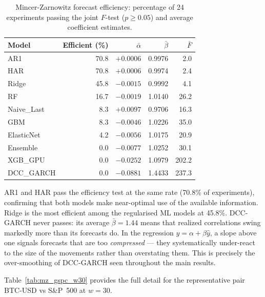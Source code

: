 \begin{table}[H]
    \centering
    \caption{Mincer-Zarnowitz forecast efficiency: percentage of 24 experiments
             passing the joint $F$-test ($p \geq 0.05$) and average coefficient estimates.}
    \label{tab:mz_summary}
    \begin{tabular}{lrrrr}
        \toprule
        Model & Efficient (\%) & $\bar{\alpha}$ & $\bar{\beta}$ & $\bar{F}$ \\
        \midrule
        AR1         & 70.8 & $+0.0006$ & 0.9976 &   2.0 \\
        HAR         & 70.8 & $+0.0006$ & 0.9974 &   2.4 \\
        Ridge       & 45.8 & $-0.0015$ & 0.9992 &   4.1 \\
        RF          & 16.7 & $-0.0019$ & 1.0140 &  26.2 \\
        Naive\_Last &  8.3 & $+0.0097$ & 0.9706 &  16.3 \\
        GBM         &  8.3 & $-0.0046$ & 1.0226 &  35.0 \\
        ElasticNet  &  4.2 & $-0.0056$ & 1.0175 &  20.9 \\
        Ensemble    &  0.0 & $-0.0077$ & 1.0252 &  30.1 \\
        XGB\_GPU    &  0.0 & $-0.0252$ & 1.0979 & 202.2 \\
        DCC\_GARCH  &  0.0 & $-0.0881$ & 1.4433 & 237.3 \\
        \bottomrule
    \end{tabular}
\end{table}

AR1 and HAR pass the efficiency test at the same rate (70.8\% of experiments),
confirming that both models make near-optimal use of the available information.
Ridge is the most efficient among the regularised ML models at 45.8\%.
DCC-GARCH never passes: its average $\bar{\beta} = 1.44$ means that realized
correlations swing markedly more than its forecasts do. In the regression
$y = \alpha + \beta\hat{y}$, a slope above one signals forecasts that are too
\emph{compressed} --- they systematically under-react to the size of the
movements rather than overstating them. This is precisely the over-smoothing
of DCC-GARCH seen throughout the main results.

Table~\ref{tab:mz_gspc_w30} provides the full detail for the representative
pair BTC-USD vs S\&P~500 at $w = 30$.

